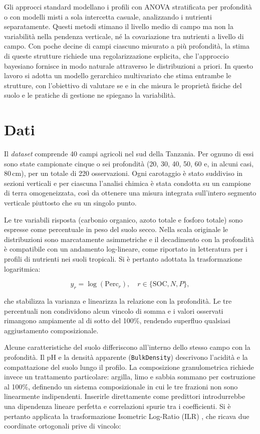 \documentclass[11pt, a4paper]{article}
\newcommand{\SOC}{\mathrm{SOC}}
\begin{document}
Gli approcci standard modellano i profili con ANOVA stratificata per profondità o con modelli misti a sola intercetta casuale, analizzando i nutrienti separatamente. Questi metodi stimano il livello medio di campo ma non la variabilità nella pendenza verticale, né la covariazione tra nutrienti a livello di campo. Con poche decine di campi ciascuno misurato a più profondità, la stima di queste strutture richiede una regolarizzazione esplicita, che l'approccio bayesiano fornisce in modo naturale attraverso le distribuzioni a priori. In questo lavoro si adotta un modello gerarchico multivariato che stima entrambe le strutture, con l'obiettivo di valutare se e in che misura le proprietà fisiche del suolo e le pratiche di gestione ne spiegano la variabilità.


\section{Dati}
\label{sec:dati}


Il \textit{dataset} comprende 40 campi agricoli nel sud della Tanzania. Per ognuno di essi sono state campionate cinque o sei profondità (20, 30, 40, 50, 60 e, in alcuni casi, 80\,cm), per un totale di 220 osservazioni. Ogni carotaggio è stato suddiviso in sezioni verticali e per ciascuna l'analisi chimica è stata condotta su un campione di terra omogeneizzata, così da ottenere una misura integrata sull'intero segmento verticale piuttosto che su un singolo punto.

Le tre variabili risposta (carbonio organico, azoto totale e fosforo totale) sono espresse come percentuale in peso del suolo secco. Nella scala originale le distribuzioni sono marcatamente asimmetriche e il decadimento con la profondità è compatibile con un andamento log-lineare, come riportato in letteratura per i profili di nutrienti nei suoli tropicali. Si è pertanto adottata la trasformazione logaritmica:

\[
  y_r = \log(\text{Perc}_r), \quad r \in \{\SOC, N, P\},
\]

che stabilizza la varianza e linearizza la relazione con la profondità. Le tre percentuali non condividono alcun vincolo di somma e i valori osservati rimangono ampiamente al di sotto del 100\%, rendendo superfluo qualsiasi aggiustamento composizionale.

Alcune caratteristiche del suolo differiscono all'interno dello stesso campo con la profondità. Il pH e la densità apparente (\texttt{BulkDensity}) descrivono l'acidità e la compattazione del suolo lungo il profilo. La composizione granulometrica richiede invece un trattamento particolare: argilla, limo e sabbia sommano per costruzione al 100\%, definendo un sistema composizionale in cui le tre frazioni non sono linearmente indipendenti. Inserirle direttamente come predittori introdurrebbe una dipendenza lineare perfetta e correlazioni spurie tra i coefficienti. Si è pertanto applicata la trasformazione Isometric Log-Ratio (ILR) \citep{egozcue2003isometric}, che ricava due coordinate ortogonali prive di vincolo:
\end{document}
